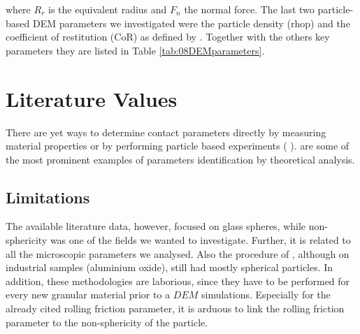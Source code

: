 

where $R_r$ is the equivalent radius and $F_n$ the normal force.
The last two particle-based \acs{DEM} parameters we investigated were 
the particle density (\acs{rhop})
and the coefficient of restitution (\acs{CoR}) as defined by
\citet{RefWorks:131}.
Together with the others key parameters they are listed in Table
\ref{tab:08DEMparameters}.\\



\section{Literature Values}
\label{sec:literaturevalues}

There are yet ways to determine contact parameters directly by measuring
material properties or by performing particle based experiments (
\cite{RefWorks:50, RefWorks:52, RefWorks:53, RefWorks:55, RefWorks:58,
RefWorks:62, RefWorks:64, RefWorks:68, RefWorks:75, RefWorks:80, RefWorks:83,
RefWorks:85, RefWorks:88, RefWorks:89, RefWorks:90, RefWorks:95, RefWorks:96, RefWorks:101, RefWorks:107, RefWorks:115,
RefWorks:120, RefWorks:123, RefWorks:124, RefWorks:128, RefWorks:135,
RefWorks:149, RefWorks:153, RefWorks:154, RefWorks:155, RefWorks:156,
RefWorks:162, RefWorks:177, RefWorks:181, RefWorks:186}).
\citet{RefWorks:57, RefWorks:140, RefWorks:146, RefWorks:165, RefWorks:190}
are some of the most prominent examples of parameters identification by
theoretical analysis. 

\subsection{Limitations}
\label{subsec:limitations}

The available literature data, however, focused on glass spheres, while
non-sphericity was one of the fields we wanted to investigate. 
Further, it is related to all the microscopic parameters we analysed. 
Also the procedure of \citet{RefWorks:177}, although on
industrial samples (aluminium oxide), still had mostly spherical particles. 
In addition, these methodologies are laborious, 
since they have to be performed for every new granular material prior to a $DEM$
simulations. 
Especially for the already cited rolling friction parameter, it is arduous to
link the rolling friction parameter to the non-sphericity of the particle. 


